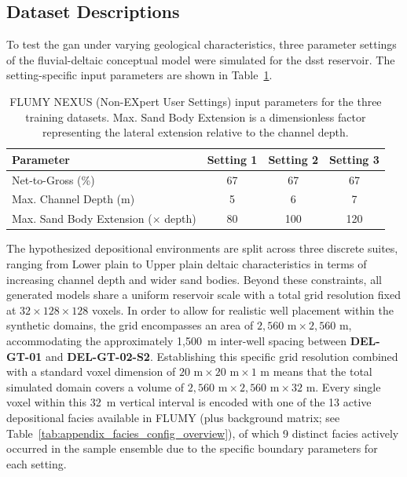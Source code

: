 \subsection{Dataset Descriptions}\label{Subsec:Dataset_descriptions}
To test the \gls{gan} under varying geological characteristics, three parameter settings of the fluvial-deltaic conceptual model were simulated for the \gls{dsst} reservoir. The setting-specific input parameters are shown in Table~\ref{tab:NEXUS_input}.
\begin{table}[htbp]
    \centering
    \renewcommand{\arraystretch}{1.2}
    \begin{tabular}{p{}ccc}
        \hline
        \textbf{Parameter} & \textbf{Setting 1} & \textbf{Setting 2} & \textbf{Setting 3} \\
        \hline
        Net-to-Gross (\%) & 67 & 67 & 67 \\
        Max. Channel Depth (m) & 5 & 6 & 7 \\
        Max. Sand Body Extension ($\times$ depth) & 80 & 100 & 120 \\
        \hline
    \end{tabular}
    \caption{FLUMY NEXUS (Non-EXpert User Settings) input parameters for the three training datasets. Max. Sand Body Extension is a dimensionless factor representing the lateral extension relative to the channel depth.}
    \label{tab:NEXUS_input}
\end{table}
The hypothesized depositional environments are split across three discrete suites, ranging from Lower plain to Upper plain deltaic characteristics in terms of increasing channel depth and wider sand bodies. Beyond these constraints, all generated models share a uniform reservoir scale with a total grid resolution fixed at $32 \times 128 \times 128$ voxels. In order to allow for realistic well placement within the synthetic domains, the grid encompasses an area of $2,560\text{~m} \times 2,560\text{~m}$, accommodating the approximately 1,500~m inter-well spacing between \textbf{DEL-GT-01} and \textbf{DEL-GT-02-S2}. Establishing this specific grid resolution combined with a standard voxel dimension of $20\text{~m} \times 20\text{~m} \times 1\text{~m}$ means that the total simulated domain covers a volume of $2,560\text{~m} \times 2,560\text{~m} \times 32\text{~m}$. Every single voxel within this 32~m vertical interval is encoded with one of the 13 active depositional facies available in FLUMY (plus background matrix; see Table~\ref{tab:appendix_facies_config_overview}), of which 9 distinct facies actively occurred in the sample ensemble due to the specific boundary parameters for each setting.

